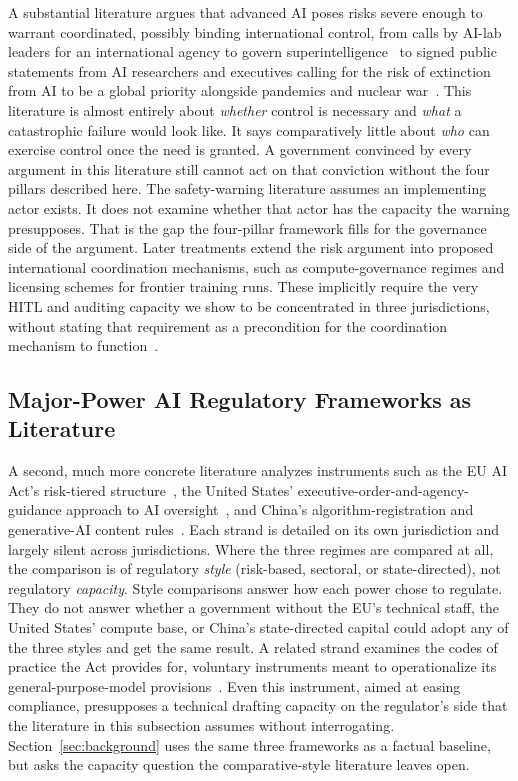 \documentclass{ieeeaccess}
\begin{document}
A substantial literature argues that advanced AI poses risks severe enough to warrant coordinated, possibly binding international control, from calls by AI-lab leaders for an international agency to govern superintelligence~\cite{altman2023governance}
to signed public statements from AI researchers and executives calling for the risk of extinction from AI to be a global priority alongside pandemics and nuclear war~\cite{cais2023statement}.
This literature is almost entirely about \textit{whether} control is necessary and \textit{what} a catastrophic failure would look like. It says comparatively little about \textit{who} can exercise control once the need is granted. A government convinced by every argument in this literature still cannot act on that conviction without the four pillars described here. The safety-warning literature assumes an implementing actor exists. It does not examine whether that actor has the capacity the warning presupposes. That is the gap the four-pillar framework fills for the governance side of the argument. Later treatments extend the risk argument into proposed international coordination mechanisms, such as compute-governance regimes and licensing schemes for frontier training runs. These implicitly require the very HITL and auditing capacity we show to be concentrated in three jurisdictions, without stating that requirement as a precondition for the coordination mechanism to function~\cite{belfield2025institutions}.

\subsection{Major-Power AI Regulatory Frameworks as Literature}

A second, much more concrete literature analyzes instruments such as the EU AI Act's risk-tiered structure~\cite{euaiact2024},
the United States' executive-order-and-agency-guidance approach to AI oversight~\cite{trump2025eo14365},
and China's algorithm-registration and generative-AI content rules~\cite{cac2023interim}.
Each strand is detailed on its own jurisdiction and largely silent across jurisdictions. Where the three regimes are compared at all, the comparison is of regulatory \textit{style} (risk-based, sectoral, or state-directed), not regulatory \textit{capacity}. Style comparisons answer how each power chose to regulate. They do not answer whether a government without the EU's technical staff, the United States' compute base, or China's state-directed capital could adopt any of the three styles and get the same result. A related strand examines the codes of practice the Act provides for, voluntary instruments meant to operationalize its general-purpose-model provisions~\cite{euaiact2024}.
Even this instrument, aimed at easing compliance, presupposes a technical drafting capacity on the regulator's side that the literature in this subsection assumes without interrogating. Section~\ref{sec:background} uses the same three frameworks as a factual baseline, but asks the capacity question the comparative-style literature leaves open.
\end{document}
